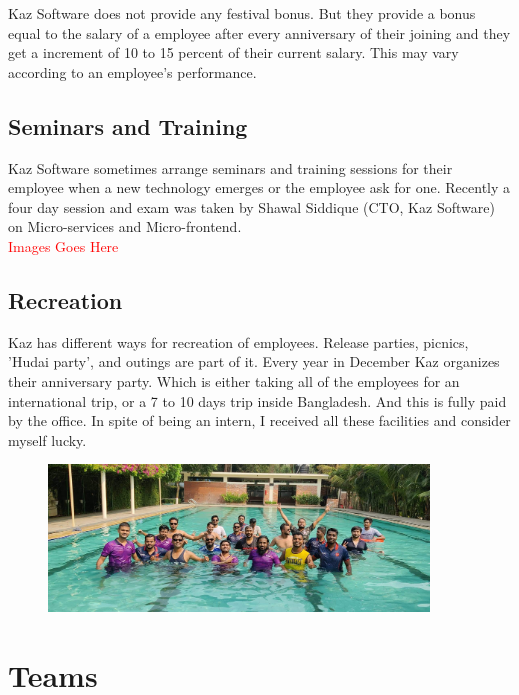 Kaz Software does not provide any festival bonus.
But they provide a bonus equal to the salary of a employee after every anniversary of their joining and they get a increment of 10 to 15 percent of their current salary.
This may vary according to an employee's performance.

\subsection{Seminars and Training}

Kaz Software sometimes arrange seminars and training sessions for their employee when a new technology emerges or the employee ask for one.
Recently a four day session and exam was taken by Shawal Siddique (CTO, Kaz Software) on Micro-services and Micro-frontend.
\\

\textcolor{red}{\LARGE Images Goes Here}

\subsection{Recreation}

Kaz has different ways for recreation of employees.
Release parties, picnics, ’Hudai party’, and outings are part of it.
Every year in December Kaz organizes their anniversary party.
Which is either taking all of the employees for an international trip, or a 7 to 10 days trip inside Bangladesh.
And this is fully paid by the office.
In spite of being an intern, I received all these facilities and consider myself lucky.
\\

\begin{figure}[h]
    \begin{center}
        \includegraphics[width=0.9\textwidth]{images/Chapter2/ceo_tour.jpeg}
        \label{fig:CEO_Tour}
    \end{center}
\end{figure}

\section{Teams}

